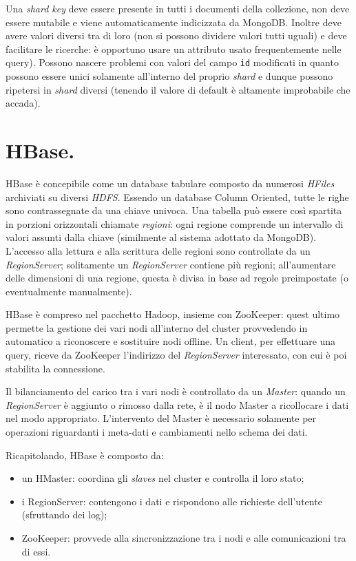 \documentclass[a4page, 11pt]{article}
\begin{document}
Una \textit{shard key} deve essere presente in tutti i documenti della collezione, non deve essere mutabile e viene automaticamente indicizzata da MongoDB.
Inoltre deve avere valori diversi tra di loro (non si possono dividere valori tutti uguali) e deve facilitare le ricerche: è opportuno usare un attributo usato frequentemente nelle query).
Possono nascere problemi con valori del campo \verb|id| modificati in quanto possono essere unici solamente all'interno del proprio \textit{shard} e dunque possono ripetersi in \textit{shard} diversi (tenendo il valore di default è altamente improbabile che accada).

\section{HBase.}
HBase è concepibile come un database tabulare composto da numerosi \textit{HFiles} archiviati su diversi \textit{HDFS}.
Essendo un database Column Oriented, tutte le righe sono contrassegnate da una chiave univoca.
Una tabella può essere così spartita in porzioni orizzontali chiamate \textit{regioni}: ogni regione comprende un intervallo di valori assunti dalla chiave (similmente al sistema adottato da MongoDB).
L'accesso alla lettura e alla scrittura delle regioni sono controllate da un \textit{RegionServer}; solitamente un \textit{RegionServer} contiene più regioni; all'aumentare delle dimensioni di una regione, questa è divisa in base ad regole preimpostate (o eventualmente manualmente).

HBase è compreso nel pacchetto Hadoop, insieme con ZooKeeper: quest ultimo permette la gestione dei vari nodi all'interno del cluster provvedendo in automatico a riconoscere e sostituire nodi offline.
Un client, per effettuare una query, riceve da ZooKeeper l'indirizzo del \textit{RegionServer} interessato, con cui è poi stabilita la connessione.

Il bilanciamento del carico tra i vari nodi è controllato da un \textit{Master}: quando un \textit{RegionServer} è aggiunto o rimosso dalla rete, è il nodo Master a ricollocare i dati nel modo appropriato.
L'intervento del Master è necessario solamente per operazioni riguardanti i meta-dati e cambiamenti nello schema dei dati.

Ricapitolando, HBase è composto da:
\begin{itemize}
\item un HMaster: coordina gli \textit{slaves} nel cluster e controlla il loro stato;
\item i RegionServer: contengono i dati e rispondono alle richieste dell'utente (sfruttando dei log);
\item ZooKeeper: provvede alla sincronizzazione tra i nodi e alle comunicazioni tra di essi.
\end{itemize}
\end{document}
